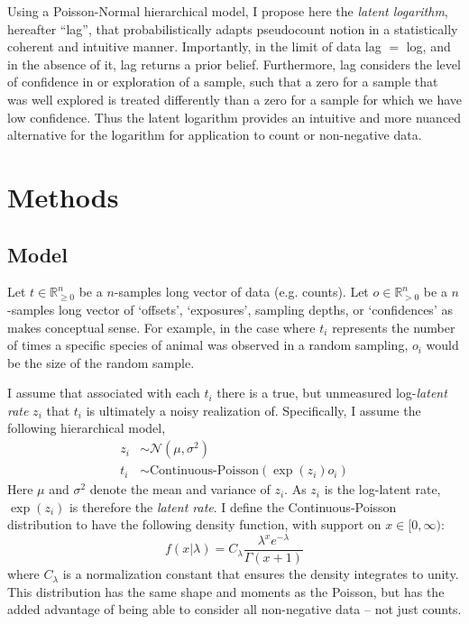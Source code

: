 \documentclass[11pt]{article}
\begin{document}
Using a Poisson-Normal hierarchical model, I propose here the \emph{latent logarithm}, hereafter ``lag'', that probabilistically adapts pseudocount notion in a statistically coherent and intuitive manner. Importantly, in the limit of data lag $=$ log, and in the absence of it, lag returns a prior belief. Furthermore, lag considers the level of confidence in or exploration of a sample, such that a zero for a sample that was well explored is treated differently than a zero for a sample for which we have low confidence. Thus the latent logarithm provides an intuitive and more nuanced alternative for the logarithm for application to count or non-negative data.

\section{Methods}

\subsection{Model}
Let $t \in \mathbb{R}_{\geq 0}^n$ be a $n$-samples long vector of data (e.g. counts). Let $o \in \mathbb{R}_{> 0}^n$ be a $n$-samples long vector of `offsets', `exposures', sampling depths, or `confidences' as makes conceptual sense. For example, in the case where $t_i$ represents the number of times a specific species of animal was observed in a random sampling, $o_i$ would be the size of the random sample. 

I assume that associated with each $t_i$ there is a true, but unmeasured log-\emph{latent rate} $z_i$ that $t_i$ is ultimately a noisy realization of. Specifically, I assume the following hierarchical model,
\begin{align*}
z_i &\sim \mathcal{N}\left(\mu, \sigma^2\right) \\
t_i & \sim \textrm{Continuous-Poisson}(\exp(z_i)o_i)
\end{align*}
Here $\mu$ and $\sigma^2$ denote the mean and variance of $z_i$. As $z_i$ is the log-latent rate, $\exp(z_i)$ is therefore the \emph{latent rate}. I define the Continuous-Poisson distribution to have the following density function, with support on $x \in [0, \infty)$: 
\[
f(x|\lambda) = C_{\lambda}\frac{ \lambda^x e^{-\lambda}}{\Gamma(x + 1)}
\]
where $C_\lambda$ is a normalization constant that ensures the density integrates to unity. This distribution has the same shape and moments as the Poisson, but has the added advantage of being able to consider all non-negative data -- not just counts.
\end{document}
